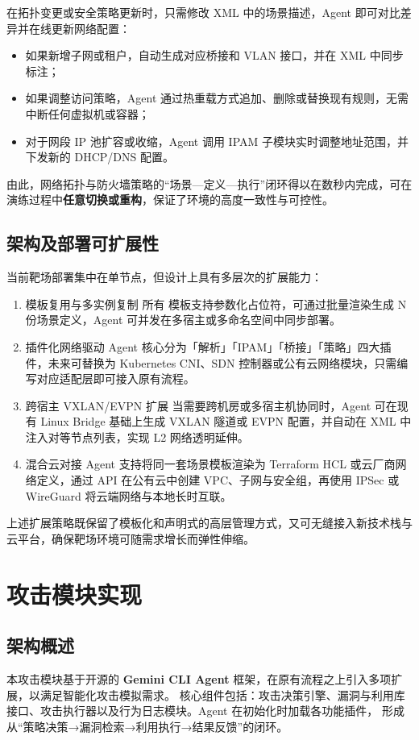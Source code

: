 \documentclass[lang=cn,10pt]{elegantbook}
\begin{document}
在拓扑变更或安全策略更新时，只需修改 XML 中的场景描述，Agent 即可对比差异并在线更新网络配置：  
\begin{itemize}
  \item 如果新增子网或租户，自动生成对应桥接和 VLAN 接口，并在 XML 中同步标注；  
  \item 如果调整访问策略，Agent 通过热重载方式追加、删除或替换现有规则，无需中断任何虚拟机或容器；  
  \item 对于网段 IP 池扩容或收缩，Agent 调用 IPAM 子模块实时调整地址范围，并下发新的 DHCP/DNS 配置。  
\end{itemize}

由此，网络拓扑与防火墙策略的“场景—定义—执行”闭环得以在数秒内完成，可在演练过程中\textbf{任意切换或重构}，保证了环境的高度一致性与可控性。


\subsection{架构及部署可扩展性}

当前靶场部署集中在单节点，但设计上具有多层次的扩展能力：

\begin{enumerate}
  \item 模板复用与多实例复制  
        所有  模板支持参数化占位符，可通过批量渲染生成 N 份场景定义，Agent 可并发在多宿主或多命名空间中同步部署。  
  \item 插件化网络驱动  
        Agent 核心分为「解析」「IPAM」「桥接」「策略」四大插件，未来可替换为 Kubernetes CNI、SDN 控制器或公有云网络模块，只需编写对应适配层即可接入原有流程。  
  \item 跨宿主 VXLAN/EVPN 扩展  
        当需要跨机房或多宿主机协同时，Agent 可在现有 Linux Bridge 基础上生成 VXLAN 隧道或 EVPN 配置，并自动在 XML 中注入对等节点列表，实现 L2 网络透明延伸。  
  \item 混合云对接  
        Agent 支持将同一套场景模板渲染为 Terraform HCL 或云厂商网络定义，通过 API 在公有云中创建 VPC、子网与安全组，再使用 IPSec 或 WireGuard 将云端网络与本地长时互联。  
\end{enumerate}

上述扩展策略既保留了模板化和声明式的高层管理方式，又可无缝接入新技术栈与云平台，确保靶场环境可随需求增长而弹性伸缩。




\section{攻击模块实现}
\subsection{架构概述}
本攻击模块基于开源的 \textbf{Gemini CLI Agent} 框架，在原有流程之上引入多项扩展，以满足智能化攻击模拟需求。
核心组件包括：攻击决策引擎、漏洞与利用库接口、攻击执行器以及行为日志模块。Agent 在初始化时加载各功能插件，
形成从“策略决策→漏洞检索→利用执行→结果反馈”的闭环。
\end{document}
